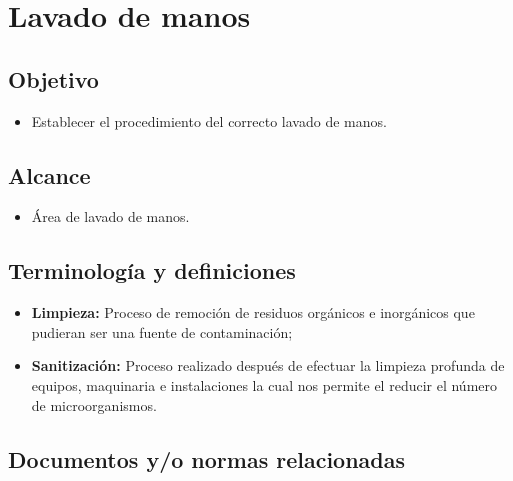 \renewcommand{\MenorVer}{0}
\renewcommand{\MayorVer}{2}
\renewcommand{\Codigo}{HYS-20-IT}
\renewcommand{\FechaPub}{2023--01}
\renewcommand{\Titulo}{Lavado de manos}

\section{\Titulo}

\subsection{Objetivo}

\begin{itemize}
	\item Establecer el procedimiento del correcto lavado de manos.
\end{itemize}

\subsection{Alcance}

\begin{itemize}
	\item Área de lavado de manos.
\end{itemize}

\subsection{Terminología y definiciones}

\begin{itemize}
	\item \textbf{Limpieza:} Proceso de remoción de residuos orgánicos e inorgánicos que pudieran ser una fuente de contaminación;
	\item \textbf{Sanitización:} Proceso realizado después de efectuar la limpieza profunda de equipos, maquinaria e instalaciones la cual nos permite el reducir el número de microorganismos.
\end{itemize}

\subsection{Documentos y/o normas relacionadas}

